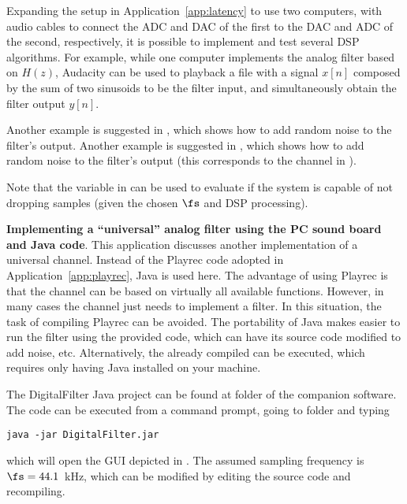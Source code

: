 

Expanding the setup in Application~\ref{app:latency} to use two computers, with audio cables to connect the ADC and DAC of the first to the DAC and ADC of the second, respectively, it is possible to implement and test several DSP algorithms. For example, while one computer implements the analog filter based on $H(z)$, Audacity can be used to playback a file with a signal $x[n]$ composed by the sum of two sinusoids to be the filter input, and simultaneously obtain the filter output $y[n]$.

\ifml
Another example is suggested in , which shows how to add random noise to the filter's output.
\else
Another example is suggested in , which shows how to add random noise to the filter's output (this corresponds to the channel in ).
\fi



Note that the variable  in  can be used to evaluate if the system is capable of not dropping samples (given the chosen $\fs$ and DSP processing).
\eApplication 

\bApplication \textbf{Implementing a ``universal'' analog filter using the PC sound board and Java code}.
\label{app:javaUniversalChannel}
This application discusses another implementation of a universal channel. Instead of the Playrec {\matlab} code adopted in Application~\ref{app:playrec}, Java is used here. The advantage of using Playrec is that the channel can be based on virtually all {\matlab} available functions. However, in many cases the channel just needs to implement a filter. In this situation, the task of compiling Playrec can be avoided. The portability of Java makes easier to run the filter using the provided code, which can have its source code modified to add noise, etc. Alternatively, the already
compiled  can be executed, which requires only having Java installed on
your machine.

The DigitalFilter Java project can be found at folder  of the companion software.
The code can be executed from a command prompt, going to folder
 and typing 
\begin{lstlisting}
java -jar DigitalFilter.jar
\end{lstlisting}
which will open the GUI depicted in .
The assumed sampling frequency is $\fs=44.1$~kHz,
which can be modified by editing the source code
and recompiling.

